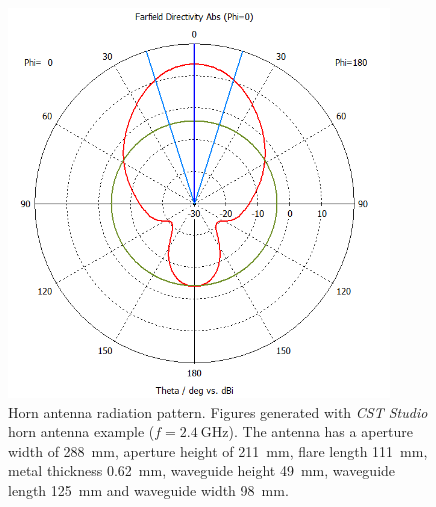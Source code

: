 \begin{figure}[H]
\begin{minipage}{0.45\textwidth}
        \includegraphics[width=0.9\textwidth]{figures/farfield (f=2.4) horn_1.png} %
    \end{minipage}
    \caption{Horn antenna radiation pattern. Figures generated with \textit{CST Studio} horn antenna example ($f=\SI{2.4}{\giga\hertz}$). The antenna has a aperture width of \SI{288}{\milli\meter}, aperture height of \SI{211}{\milli\meter}, flare length \SI{111}{\milli\meter}, metal thickness \SI{0.62}{\milli\meter}, waveguide height \SI{49}{\milli\meter}, waveguide length \SI{125}{\milli\meter} and waveguide width \SI{98}{\milli\meter}.}
    \label{fig:horn_1}
\end{figure}

